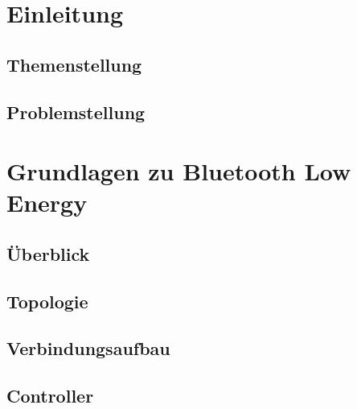 \documentclass[doktyp=barbeit]{TUBAFarbeiten}
\begin{document}
\maketitle

\TUBAFErklaerungsseite



\tableofcontents
\newpage
\listoffigures
\listoftables

\newpage
\section{Einleitung}
\label{sec: einleitung}

	\subsection{Themenstellung}
		\label{sec: themenstellung}
		

	\subsection{Problemstellung}
		\label{sec: problemstellung}
		

\newpage
\section{Grundlagen zu Bluetooth Low Energy}
\label{sec: grundlagen le}

	\subsection{Überblick}
		\label{sec: le ueberblick}
		

	\subsection{Topologie}
		\label{sec: le topologie}
		

	\subsection{Verbindungsaufbau}
		\label{sec: le verbindungsaufbau}
		

	\subsection{Controller}
		\label{sec: le controller}
		
\end{document}

